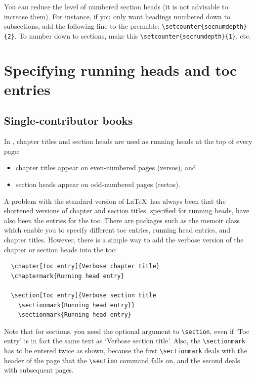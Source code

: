 You can reduce the level of numbered section heads (it is not advisable to increase them). For instance, if you only want headings numbered down to subsections, add the following line to the preamble: \verb"\setcounter{secnumdepth}{2}". To number down to sections, make this \verb"\setcounter{secnumdepth}{1}", etc.


\section{Specifying running heads and toc entries}

\subsection{Single-contributor books}
\label{singlecontributor}

In \cambridge, chapter titles and section heads are used as running heads at the top of every page:
\begin{itemize}
\item chapter titles appear on even-numbered pages (versos), and
\item section heads appear on odd-numbered pages (rectos).
\end{itemize}
A problem with the standard version of \LaTeX\ has always been that the shortened versions of chapter and section titles, specified for running heads, have also been the entries for the toc. There are packages such as the memoir class which enable you to specify different toc entries, running head entries, and chapter titles. However, there is a simple way to add the verbose version of the chapter or section heads into the toc:
\begin{verbatim}
  \chapter[Toc entry]{Verbose chapter title}
  \chaptermark{Running head entry}

  \section[Toc entry]{Verbose section title
    \sectionmark{Running head entry}}
    \sectionmark{Running head entry}
\end{verbatim}
Note that for sections, you need the optional argument to \verb"\section", even if `Toc entry' is in fact the same text as `Verbose section title'. Also, the \verb"\sectionmark" has to be entered twice as shown, because the first \verb"\sectionmark" deals with the header of the page that the \verb"\section" command falls on, and the second deals with subsequent pages.

